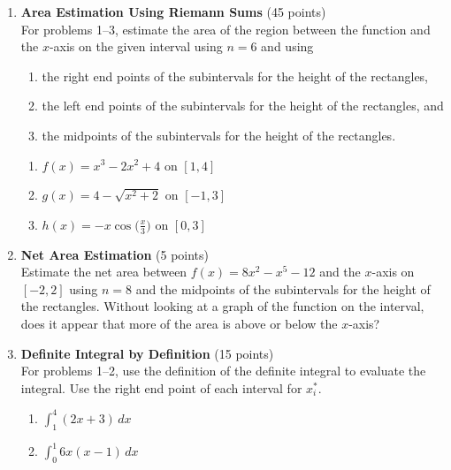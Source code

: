 \begin{enumerate}
  \item \textbf{Area Estimation Using Riemann Sums} (45 points)\\
  For problems 1--3, estimate the area of the region between the function and the $x$-axis on the given interval using $n = 6$ and using
  \begin{enumerate}[label=(\alph*)]
    \item the right end points of the subintervals for the height of the rectangles,
    \item the left end points of the subintervals for the height of the rectangles, and
    \item the midpoints of the subintervals for the height of the rectangles.
  \end{enumerate}
  \begin{enumerate}
    \item $f(x) = x^3 - 2 x^2 + 4$ on $[1, 4]$
    \item $g(x) = 4 - \sqrt{x^2 + 2}$ on $[-1, 3]$
    \item $h(x) = -x \cos\bigl(\frac{x}{3}\bigr)$ on $[0, 3]$
  \end{enumerate}
  \begin{subanswer}
  \end{subanswer}

  \item \textbf{Net Area Estimation} (5 points)\\
  Estimate the net area between $f(x) = 8 x^2 - x^5 - 12$ and the $x$-axis on $[-2, 2]$ using $n = 8$ and the midpoints of the subintervals for the height of the rectangles. Without looking at a graph of the function on the interval, does it appear that more of the area is above or below the $x$-axis?
  \begin{subanswer}
  \end{subanswer}

  \item \textbf{Definite Integral by Definition} (15 points)\\
  For problems 1--2, use the definition of the definite integral to evaluate the integral. Use the right end point of each interval for $x_i^*$.
  \begin{enumerate}
    \item $\displaystyle \int_1^4 (2 x + 3) \,dx$
    \item $\displaystyle \int_0^1 6 x(x - 1) \,dx$
  \end{enumerate}
  \begin{subanswer}
  \end{subanswer}


\end{enumerate}
